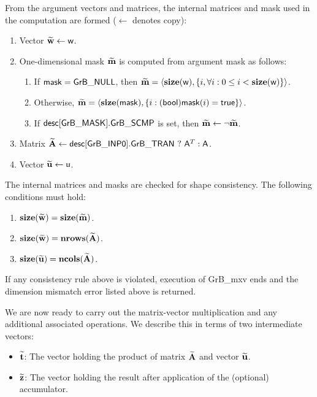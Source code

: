 From the argument vectors and matrices, the internal matrices and mask used in 
the computation are formed ($\leftarrow$ denotes copy):
\begin{enumerate}
	\item Vector ${\bf \widetilde{w}} \leftarrow {\sf w}$.

	\item One-dimensional mask ${\bf \widetilde{m}}$ is computed from 
    argument {\sf mask} as follows:
	\begin{enumerate}
		\item	If ${\sf mask} = {\sf GrB\_NULL}$, then ${\bf \widetilde{m}} = 
        \langle \bold{size}({\sf w}), \{i, \forall i : 0 \leq i < 
        \bold{size}({\sf w}) \} \rangle$.

		\item	Otherwise, ${\bf \widetilde{m}} = 
        \langle \bold{size}({\sf mask}), \{i : ({\sf bool}){\sf mask}(i) = 
        {\sf true}\} \rangle$.

		\item	If ${\sf desc[GrB\_MASK].GrB\_SCMP}$ is set, then ${\bf \widetilde{m}} \leftarrow \neg {\bf \widetilde{m}}$.
	\end{enumerate}

	\item Matrix ${\bf \widetilde{A}} \leftarrow {\sf desc[GrB\_INP0].GrB\_TRAN} \ ? \ {\sf A}^T : {\sf A}$.

	\item Vector ${\bf \widetilde{u}} \leftarrow {\sf u}$.
\end{enumerate}

The internal matrices and masks are checked for shape consistency. The following 
conditions must hold:
\begin{enumerate}
	\item $\bold{size}({\bf \widetilde{w}}) = \bold{size}({\bf \widetilde{m}})$.

	\item $\bold{size}({\bf \widetilde{w}}) = \bold{nrows}({\bf \widetilde{A}})$.

	\item $\bold{size}({\bf \widetilde{u}}) = \bold{ncols}({\bf \widetilde{A}})$.
\end{enumerate}
If any consistency rule above is violated, execution of {\sf GrB\_mxv} ends and 
the dimension mismatch error listed above is returned.

We are now ready to carry out the matrix-vector multiplication and any additional 
associated operations.  We describe this in terms of two intermediate vectors:
\begin{itemize}
	\item ${\bf \widetilde{t}}$: The vector holding the product of matrix 
    ${\bf \widetilde{A}}$ and vector ${\bf \widetilde{u}}$.
	\item ${\bf \widetilde{z}}$: The vector holding the result after 
    application of the (optional) accumulator.
\end{itemize}

